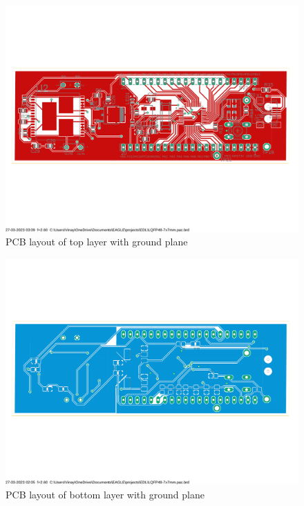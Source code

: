 \documentclass[12pt]{article}
\begin{document}
\begin{figure}[htp]
    \centering
    \includegraphics[width=\textwidth]{Images/ourpcbtopgplane.pdf}
    \caption{PCB layout of top layer with ground plane}
    \label{fig:galaxy}
\end{figure}

\begin{figure}[htp]
    \centering
    \includegraphics[width=\textwidth]{Images/ourpcbbottomgplane.pdf}
    \caption{PCB layout of bottom layer with ground plane}
    \label{fig:galaxy}
\end{figure}

\newpage
\end{document}
